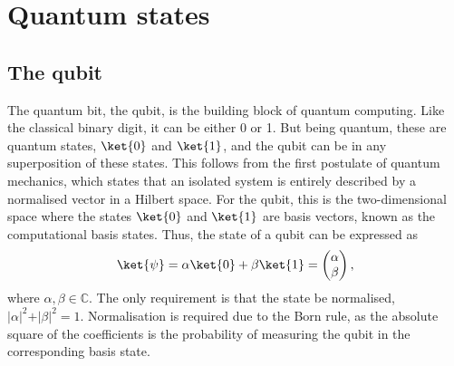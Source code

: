 \section{Quantum states}
\label{sec:qstates}
\subsection{The qubit}
The quantum bit, the qubit, is the building block of quantum computing.
Like the classical binary digit, it can be either 0 or 1.
But being quantum, these are quantum states, $\ket{0}$ and $\ket{1}$\footnotemark{}, and the qubit can be in any superposition of these states.
This follows from the first postulate of quantum mechanics\footnotemark, which states that an isolated system is entirely described by a normalised vector in a Hilbert space.
For the qubit, this is the two-dimensional space where the states $\ket{0}$ and $\ket{1}$ are basis vectors, known as the computational basis states.
Thus, the state of a qubit can be expressed as
\begin{equation}
  \ket{\psi} = \alpha \ket{0} + \beta \ket{1} = \begin{pmatrix} \alpha \\ \beta \end{pmatrix},
  \label{eq:qubit}
\end{equation}
where $\alpha, \beta \in \mathbb{C}$.
The only requirement is that the state be normalised, $\vert\alpha\vert^2 + \vert\beta\vert^2 = 1$.
Normalisation is required due to the Born rule, as the absolute square of the coefficients is the probability of measuring the qubit in the corresponding basis state.

